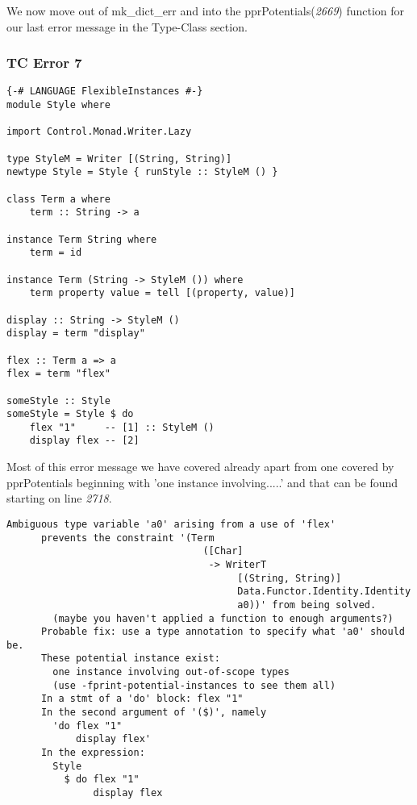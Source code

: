 \documentclass[a4paper]{article}
\begin{document}
We now move out of mk\_dict\_err and into the pprPotentials(\textit{2669}) function for our last error message in the Type-Class section. 

\subsubsection{TC Error 7}

\begin{lstlisting}[label={lst: T21.0}, numbers=none, caption={Example Program \cite{ex21}}]
{-# LANGUAGE FlexibleInstances #-}
module Style where

import Control.Monad.Writer.Lazy

type StyleM = Writer [(String, String)]
newtype Style = Style { runStyle :: StyleM () }

class Term a where
    term :: String -> a

instance Term String where
    term = id

instance Term (String -> StyleM ()) where
    term property value = tell [(property, value)]

display :: String -> StyleM ()
display = term "display"

flex :: Term a => a
flex = term "flex"

someStyle :: Style
someStyle = Style $ do
    flex "1"     -- [1] :: StyleM ()
    display flex -- [2]
\end{lstlisting}

Most of this error message we have covered already apart from one covered by pprPotentials beginning with 'one instance involving.....' and that can be found starting on line \textit{2718}. 

\begin{lstlisting}[label={lst: T21.0.2}, numbers=none, caption={Error}]
      Ambiguous type variable 'a0' arising from a use of 'flex'
      prevents the constraint '(Term
                                  ([Char]
                                   -> WriterT
                                        [(String, String)]
                                        Data.Functor.Identity.Identity
                                        a0))' from being solved.
        (maybe you haven't applied a function to enough arguments?)
      Probable fix: use a type annotation to specify what 'a0' should be.
      These potential instance exist:
        one instance involving out-of-scope types
        (use -fprint-potential-instances to see them all)
      In a stmt of a 'do' block: flex "1"
      In the second argument of '($)', namely
        'do flex "1"
            display flex'
      In the expression:
        Style
          $ do flex "1"
               display flex
\end{lstlisting}
\end{document}
